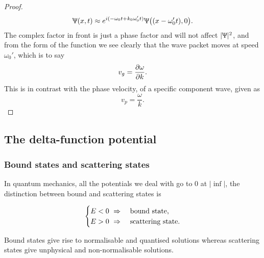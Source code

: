 \begin{proof}
\begin{equation}
\Uppsi(x,t)\approx e^{i(-\omega_0 t+k_0\omega_0't)}\Uppsi\bigl((x-\omega_0't),0\bigr).
\end{equation}
The complex factor in front is just a phase factor and will not affect $|\Uppsi|^2$, and from the form of the function we see clearly that the wave packet moves at speed $\omega_0'$, which is to say
\begin{equation}
v_g=\diffp{\omega}{k}.
\end{equation}
This is in contrast with the phase velocity, of a specific component wave, given as 
\begin{equation}
v_p=\frac{\omega}{k}.
\end{equation}
\end{proof}

\subsection{The delta-function potential}
\subsubsection{Bound states and scattering states}
\begin{defi}
In quantum mechanics, all the potentials we deal with go to $0$ at 
$|\inf|$, the distinction between bound and scattering states is
\begin{singlespace}
\begin{equation}
\begin{cases}
	E<0\ \Rightarrow\ &\text{bound state,}\\
	E>0\ \Rightarrow\ &\text{scattering state.}
\end{cases}
\end{equation}
\end{singlespace}
\end{defi}
\begin{prt}
Bound states give rise to normalisable and quantised solutions whereas scattering states give unphysical and non-normalisable solutions. 
\end{prt}
